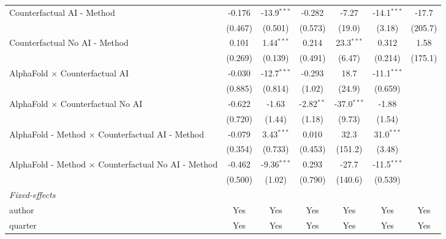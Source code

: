 \begin{tabular}{lcccccc}
   Counterfactual AI - Method                                 & -0.176       & -13.9$^{***}$ & -0.282       & -7.27         & -14.1$^{***}$ & -17.7\\   
                                                              & (0.467)      & (0.501)       & (0.573)      & (19.0)        & (3.18)        & (205.7)\\   
   Counterfactual No AI - Method                              & 0.101        & 1.44$^{***}$  & 0.214        & 23.3$^{***}$  & 0.312         & 1.58\\   
                                                              & (0.269)      & (0.139)       & (0.491)      & (6.47)        & (0.214)       & (175.1)\\   
   AlphaFold $\times$ Counterfactual AI                       & -0.030       & -12.7$^{***}$ & -0.293       & 18.7          & -11.1$^{***}$ &   \\   
                                                              & (0.885)      & (0.814)       & (1.02)       & (24.9)        & (0.659)       &   \\   
   AlphaFold $\times$ Counterfactual No AI                    & -0.622       & -1.63         & -2.82$^{**}$ & -37.0$^{***}$ & -1.88         &   \\   
                                                              & (0.720)      & (1.44)        & (1.18)       & (9.73)        & (1.54)        &   \\   
   AlphaFold - Method $\times$ Counterfactual AI - Method     & -0.079       & 3.43$^{***}$  & 0.010        & 32.3          & 31.0$^{***}$  &   \\   
                                                              & (0.354)      & (0.733)       & (0.453)      & (151.2)       & (3.48)        &   \\   
   AlphaFold - Method $\times$ Counterfactual No AI - Method  & -0.462       & -9.36$^{***}$ & 0.293        & -27.7         & -11.5$^{***}$ &   \\   
                                                              & (0.500)      & (1.02)        & (0.790)      & (140.6)       & (0.539)       &   \\   
   \midrule
   \emph{Fixed-effects}\\
   author                                                     & Yes          & Yes           & Yes          & Yes           & Yes           & Yes\\  
   quarter                                                    & Yes          & Yes           & Yes          & Yes           & Yes           & Yes\\  

\end{tabular}
